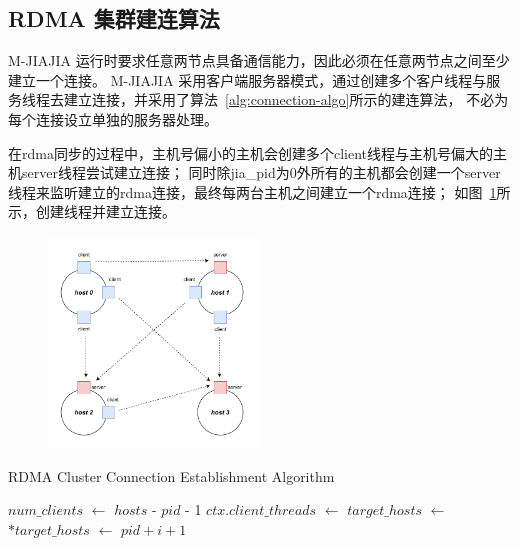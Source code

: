 {    \subsection{RDMA 集群建连算法}

    M-JIAJIA 运行时要求任意两节点具备通信能力，因此必须在任意两节点之间至少建立一个连接。
    M-JIAJIA 采用客户端服务器模式，通过创建多个客户线程与服务线程去建立连接，并采用了算法~\ref{alg:connection-algo}所示的建连算法，
    不必为每个连接设立单独的服务器处理。

    在rdma同步的过程中，主机号偏小的主机会创建多个client线程与主机号偏大的主机server线程尝试建立连接；
    同时除jia\_pid为0外所有的主机都会创建一个server线程来监听建立的rdma连接，最终每两台主机之间建立一个rdma连接；
    如图~\ref{fig:RDMA-connection-build}所示，创建线程并建立连接。

    \begin{figure}[H]
        \centering
        \includegraphics[width=0.5\textwidth]{Img/rdma_sync.drawio.pdf}
        \label{fig:RDMA-connection-build}
    \end{figure}

    \begin{algorithm}
        \caption{RDMA Cluster Connection Establishment Algorithm}\label{alg:connection-algo}
        \begin{algorithmic}[1]
            \State {}
            \EndIf
            \State $num\_clients$ $\gets$ $hosts$ - $pid$ - 1
            \State $ctx.client\_threads$ $\gets$ 
            \State $target\_hosts$ $\gets$ 
            \State $*target\_hosts$ $\gets$ $pid + i + 1$
            \State {}
            \EndFor
            \EndIf
            \State {}
            \EndIf


\end{algorithmic}
\end{algorithm}}
